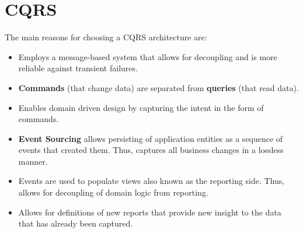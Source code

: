 \section{CQRS}

The main reasons for choosing a CQRS architecture are:

\begin{itemize}
\item Employs a message-based system that allows for decoupling and is more
  reliable against transient failures.
\item \textbf{Commands} (that change data) are separated from \textbf{queries}
  (that read data).
\item Enables domain driven design by capturing the intent in the form of
commands.
\item \textbf{Event Sourcing} allows persisting of application entities as a
  sequence of events that created them. Thus, captures all business changes in a
  lossless manner.
\item Events are used to populate views also known as the reporting side. Thus,
  allows for decoupling of domain logic from reporting.
\item Allows for definitions of new reports that provide new insight to the
  data that has already been captured.
\end{itemize}
